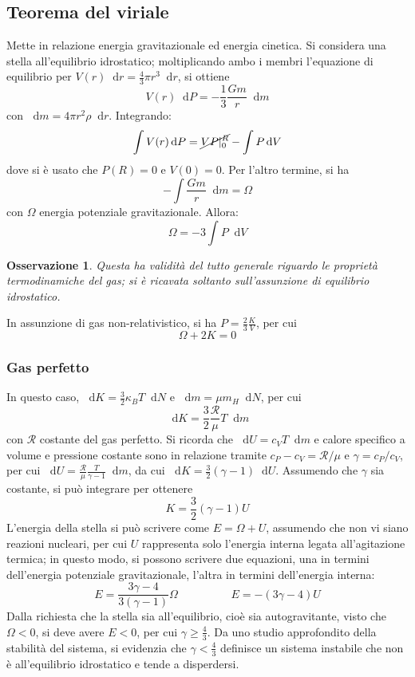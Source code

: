 \documentclass[11pt, a4paper]{scrartcl}
\theoremstyle{style}
\newtheorem{osservazione}{Osservazione}[section]
\theoremstyle{style1}
\newcommand{\dd}{\mathop{}\!\mathrm{d}}
\numberwithin{equation}{subsection}
\begin{document}
\subsection{Teorema del viriale}
Mette in relazione energia gravitazionale ed energia cinetica.
Si considera una stella all'equilibrio idrostatico; moltiplicando ambo i membri l'equazione di equilibrio per $V(r) \dd r = \frac{4}{3}\pi r^3 \dd r$, si ottiene
\[
V(r) \dd P = -\frac{1}{3} \frac{Gm}{r} \dd m
\] 
con $\dd  m = 4\pi r^2 \rho  \dd r$.
Integrando:
\[
\int V(r) \dd P = \cancel{VP|_0^R} - \int P \dd V
\] 
dove si \`e usato che $P(R) = 0$ e $V(0) = 0$. 
Per l'altro termine, si ha
\[
- \int \frac{G m }{r} \dd m = \Omega 
\] 
con $\Omega $ energia potenziale gravitazionale.
Allora:
\begin{equation}
	\Omega = -3 \int P \dd V
\end{equation}
\begin{osservazione}
Questa ha validit\`a del tutto generale riguardo le propriet\`a termodinamiche del gas; si \`e ricavata soltanto sull'assunzione di equilibrio idrostatico.
\end{osservazione}
\noindent In assunzione di gas non-relativistico, si ha $P = \frac{2}{3} \frac{K}{V}$, per cui 
\begin{equation}
	\Omega + 2K = 0
\end{equation}

\subsubsection{Gas perfetto}
In questo caso, $\dd K = \frac{3}{2}\kappa _B T \dd N$ e $\dd m = \mu m_H \dd N$, per cui
\[
	\dd K = \frac{3}{2} \frac{\mathcal{R} }{\mu }T \dd m
\] 
con $\mathcal{R} $ costante del gas perfetto.
Si ricorda che $\dd U = c_V T \dd m$ e calore specifico a volume e pressione costante sono in relazione tramite $c_P - c_V = \mathcal{R} /\mu $ e $\gamma = c_P / c_V$, per cui $\dd U = \frac{\mathcal{R} }{\mu }\frac{T}{\gamma-1} \dd m$, da cui $\dd K = \frac{3}{2} \left(\gamma- 1\right)  \dd U$.
Assumendo che $\gamma$ sia costante, si pu\`o integrare per ottenere
\begin{equation}
	K = \frac{3}{2} \left(\gamma- 1\right)  U
\end{equation}
L'energia della stella si pu\`o scrivere come $E = \Omega  + U$, assumendo che non vi siano reazioni nucleari, per cui $U$ rappresenta solo l'energia interna legata all'agitazione termica; in questo modo, si possono scrivere due equazioni, una in termini dell'energia potenziale gravitazionale, l'altra in termini dell'energia interna:
\begin{equation}
		E = \frac{3\gamma - 4}{3 (\gamma - 1)} \Omega \hspace{2cm} E = - (3 \gamma- 4) U
\end{equation}
Dalla richiesta che la stella sia all'equilibrio, cio\`e sia autogravitante, visto che $\Omega <0$, si deve avere $E<0$, per cui $\gamma\ge \frac{4}{3}$.
Da uno studio approfondito della stabilit\`a del sistema, si evidenzia che $\gamma < \frac{4}{3}$ definisce un sistema instabile che non \`e all'equilibrio idrostatico e tende a disperdersi.
\end{document}
